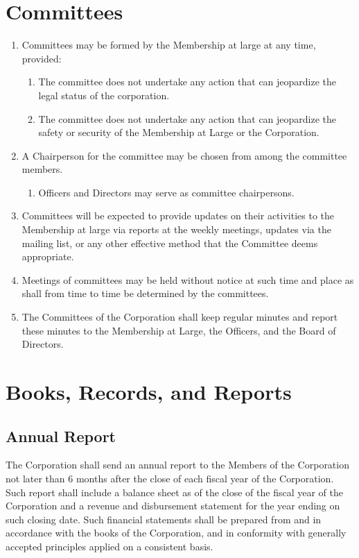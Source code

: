 \documentclass{article}
\begin{document}
\section{Committees}
\begin{enumerate}
\item Committees may be formed by the Membership at large at any time, provided:
\begin{enumerate}
\item The committee does not undertake any action that can jeopardize the legal status 
of the corporation.
\item The committee does not undertake any action that can jeopardize the safety or 
security of the Membership at Large or the Corporation.
\end{enumerate}
\item A Chairperson for the committee may be chosen from among the committee 
members.
\begin{enumerate}
\item Officers and Directors may serve as committee chairpersons.
\end{enumerate}
\item Committees will be expected to provide updates on their activities to the 
Membership at large via reports at the weekly meetings, updates via the mailing list, or any 
other effective method that the Committee deems appropriate.
\item Meetings of committees may be held without notice at such time and place as shall 
from time to time be determined by the committees.
\item The Committees of the Corporation shall keep regular minutes and report these 
minutes to the Membership at Large, the Officers, and the Board of Directors.
\end{enumerate}
\section{Books, Records, and Reports}
\subsection{Annual Report}
The Corporation shall send an annual report to the Members of the Corporation not later 
than 6 months after the close of each fiscal year of the Corporation. Such report shall 
include a balance sheet as of the close of the fiscal year of the Corporation and a revenue 
and disbursement statement for the year ending on such closing date.  Such financial 
statements shall be prepared from and in accordance with the books of the Corporation, 
and in conformity with generally accepted principles applied on a consistent basis.
\end{document}
